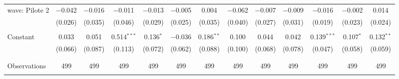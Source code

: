 \begin{tabular}{@{\extracolsep{5pt}}lcccccccccccc}
 wave: Pilote 2 & $-$0.042 & $-$0.016 & $-$0.011 & $-$0.013 & $-$0.005 & 0.004 & $-$0.062 & $-$0.007 & $-$0.009 & $-$0.016 & $-$0.002 & 0.014 \\ 
  & (0.026) & (0.035) & (0.046) & (0.029) & (0.025) & (0.035) & (0.040) & (0.027) & (0.031) & (0.019) & (0.023) & (0.024) \\ 
  & & & & & & & & & & & & \\ 
 Constant & 0.033 & 0.051 & 0.514$^{***}$ & 0.136$^{*}$ & $-$0.036 & 0.186$^{**}$ & 0.100 & 0.044 & 0.042 & 0.139$^{***}$ & 0.107$^{*}$ & 0.132$^{**}$ \\ 
  & (0.066) & (0.087) & (0.113) & (0.072) & (0.062) & (0.088) & (0.100) & (0.068) & (0.078) & (0.047) & (0.058) & (0.059) \\ 
  & & & & & & & & & & & & \\ 
\hline \\[-1.8ex] 

Observations & 499 & 499 & 499 & 499 & 499 & 499 & 499 & 499 & 499 & 499 & 499 & 499 \\ 
\hline 
\hline \\[-1.8ex] 
\end{tabular} 